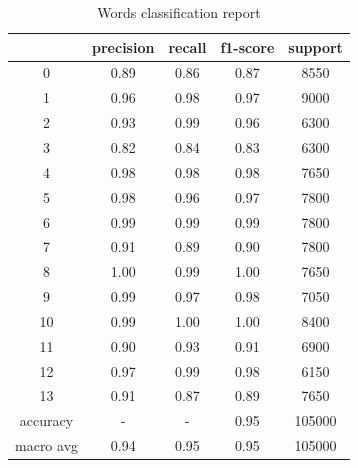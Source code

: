\begin{table}[h]
	\centering
	\begin{tabular}{|c|c|c|c|c|}
		\hline
		& precision & recall & f1-score & support \\
		\hline
		0 & 0.89 & 0.86 & 0.87 & 8550 \\
		\hline
		1 & 0.96 & 0.98 & 0.97 & 9000 \\
		\hline
		2 & 0.93 & 0.99 & 0.96 & 6300 \\
		\hline
		3 & 0.82 & 0.84 & 0.83 & 6300 \\
		\hline
		4 & 0.98 & 0.98 & 0.98 & 7650 \\
		\hline
		5 & 0.98 & 0.96 & 0.97 & 7800 \\
		\hline
		6 & 0.99 & 0.99 & 0.99 & 7800 \\
		\hline
		7 & 0.91 & 0.89 & 0.90 & 7800 \\
		\hline
		8 & 1.00 & 0.99 & 1.00 & 7650 \\
		\hline
		9 & 0.99 & 0.97 & 0.98 & 7050 \\
		\hline
		10 & 0.99 & 1.00 & 1.00 & 8400 \\
		\hline
		11 & 0.90 & 0.93 & 0.91 & 6900 \\
		\hline
		12 & 0.97 & 0.99 & 0.98 & 6150 \\
		\hline
		13 & 0.91 & 0.87 & 0.89 & 7650 \\
		\hline
		accuracy & - & - & 0.95 & 105000 \\
		\hline
		macro avg & 0.94 & 0.95 & 0.95 & 105000 \\
		\hline
	\end{tabular}
	\caption{Words classification report}
	\label{tab:words_classification_report}
\end{table}
